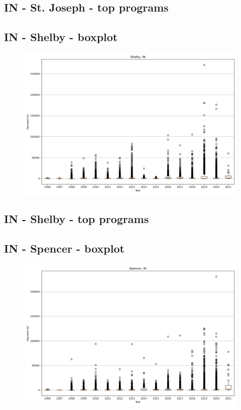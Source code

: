\subsection*{IN - St. Joseph - top programs}

\newpage
\subsection*{IN - Shelby - boxplot}
\begin{figure}[h]
\centering
\includegraphics[width=7in]{../output/boxplots/counties/Shelby-IN_boxplot.png}
\end{figure}


\subsection*{IN - Shelby - top programs}

\newpage
\subsection*{IN - Spencer - boxplot}
\begin{figure}[h]
\centering
\includegraphics[width=7in]{../output/boxplots/counties/Spencer-IN_boxplot.png}
\end{figure}


